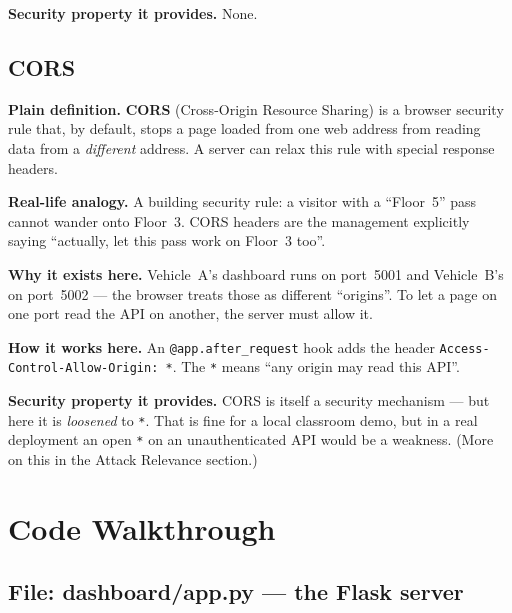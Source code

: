 \documentclass[11pt,a4paper]{report}
\begin{document}
\textbf{Security property it provides.} None.

\subsection{CORS}
\textbf{Plain definition.} \textbf{CORS} (Cross-Origin Resource Sharing) is a
browser security rule that, by default, stops a page loaded from one web address
from reading data from a \emph{different} address. A server can relax this rule
with special response headers.

\textbf{Real-life analogy.} A building security rule: a visitor with a ``Floor~5''
pass cannot wander onto Floor~3. CORS headers are the management explicitly
saying ``actually, let this pass work on Floor~3 too''.

\textbf{Why it exists here.} Vehicle~A's dashboard runs on port~5001 and
Vehicle~B's on port~5002 --- the browser treats those as different ``origins''.
To let a page on one port read the API on another, the server must allow it.

\textbf{How it works here.} An \texttt{@app.after\_request} hook adds the header
\texttt{Access-Control-Allow-Origin: *}. The \texttt{*} means ``any origin may
read this API''.

\textbf{Security property it provides.} CORS is itself a security mechanism ---
but here it is \emph{loosened} to \texttt{*}. That is fine for a local classroom
demo, but in a real deployment an open \texttt{*} on an unauthenticated API would
be a weakness. (More on this in the Attack Relevance section.)

\section{Code Walkthrough}

\subsection{File: dashboard/app.py --- the Flask server}
\end{document}
